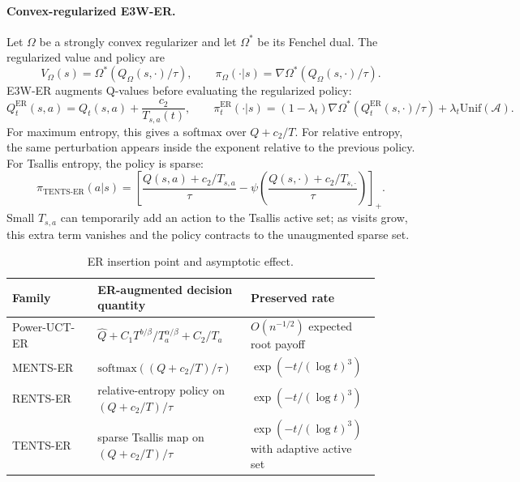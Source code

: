 \documentclass{article}
\newcommand{\Qhat}{\widehat{Q}}
\begin{document}
\paragraph{Convex-regularized E3W-ER.}
Let $\Omega$ be a strongly convex regularizer and let $\Omega^*$ be its Fenchel dual.  The regularized value and policy are
\begin{equation}
 V_\Omega(s)=\Omega^*(Q_\Omega(s,\cdot)/\tau),\qquad
 \pi_\Omega(\cdot|s)=\nabla\Omega^*(Q_\Omega(s,\cdot)/\tau).
\label{eq:main_reg_policy}
\end{equation}
E3W-ER augments Q-values before evaluating the regularized policy:
\begin{equation}
 Q_t^{\mathrm{ER}}(s,a)=Q_t(s,a)+\frac{c_2}{T_{s,a}(t)},\qquad
 \pi_t^{\mathrm{ER}}(\cdot|s)=(1-\lambda_t)\nabla\Omega^*(Q_t^{\mathrm{ER}}(s,\cdot)/\tau)+\lambda_t\mathrm{Unif}(\mathcal{A}).
\label{eq:main_e3w_er}
\end{equation}
For maximum entropy, this gives a softmax over $Q+c_2/T$.  For relative entropy, the same perturbation appears inside the exponent relative to the previous policy.  For Tsallis entropy, the policy is sparse:
\begin{equation}
\pi_{\mathrm{TENTS\text{-}ER}}(a|s)=\left[\frac{Q(s,a)+c_2/T_{s,a}}{\tau}-\psi\left(\frac{Q(s,\cdot)+c_2/T_{s,\cdot}}{\tau}\right)\right]_+.
\label{eq:main_tents_er}
\end{equation}
Small $T_{s,a}$ can temporarily add an action to the Tsallis active set; as visits grow, this extra term vanishes and the policy contracts to the unaugmented sparse set.

\begin{table}[t]
\centering
\caption{ER insertion point and asymptotic effect.}
\label{tab:main_alg_summary}
\small
\begin{tabular}{p{0.22\linewidth}p{0.36\linewidth}p{0.32\linewidth}}
\toprule
Family & ER-augmented decision quantity & Preserved rate \\
\midrule
Power-UCT-ER & $\Qhat+C_1T^{b/\beta}/T_a^{\alpha/\beta}+C_2/T_a$ & $O(n^{-1/2})$ expected root payoff \\
MENTS-ER & $\mathrm{softmax}((Q+c_2/T)/\tau)$ & $\exp(-t/(\log t)^3)$ \\
RENTS-ER & relative-entropy policy on $(Q+c_2/T)/\tau$ & $\exp(-t/(\log t)^3)$ \\
TENTS-ER & sparse Tsallis map on $(Q+c_2/T)/\tau$ & $\exp(-t/(\log t)^3)$ with adaptive active set \\
\bottomrule
\end{tabular}
\end{table}
\end{document}

